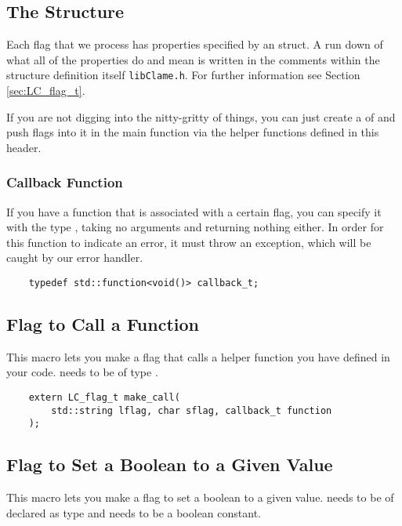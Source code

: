 \subsection{The  Structure}

Each flag that we process has properties specified by an  struct. A run down of what all of the properties do and mean is written in the comments within the structure definition itself \texttt{libClame.h}. For further information see Section \ref{sec:LC_flag_t}.

If you are not digging into the nitty-gritty of things, you can just create a  of  and push flags into it in the main function via the helper functions defined in this header.

\subsubsection{Callback Function}
\label{sec:c++callback-function}

If you have a function that is associated with a certain flag, you can specify it with the type , taking no arguments and returning nothing either. In order for this function to indicate an error, it must throw an exception, which will be caught by our error handler.

\begin{verbatim}
	typedef std::function<void()> callback_t;
\end{verbatim}

\subsection{Flag to Call a Function}
This macro lets you make a flag that calls a helper function you have defined in your code.  needs to be of type .\footnotemark


\begin{verbatim}
	extern LC_flag_t make_call(
		std::string lflag, char sflag, callback_t function
	);
\end{verbatim}

\subsection{Flag to Set a Boolean to a Given Value}
This macro lets you make a flag to set a boolean to a given value.  needs to be of declared as type  and  needs to be a boolean constant.

